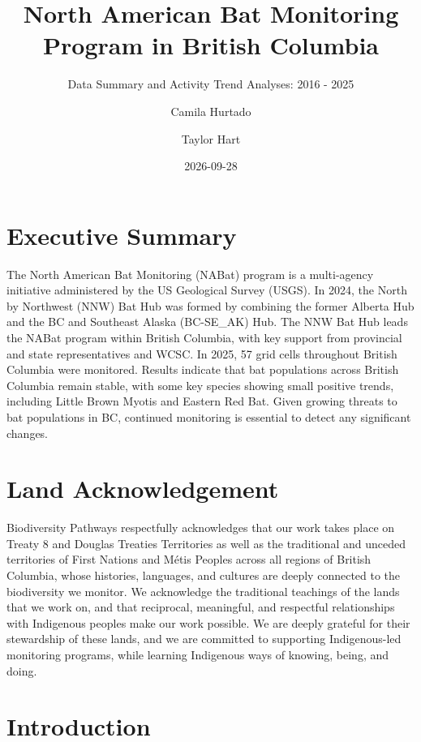 \documentclass[
  letterpaper,
  DIV=11,
  numbers=noendperiod]{scrartcl}
\title{North American Bat Monitoring Program in British Columbia}
\subtitle{Data Summary and Activity Trend Analyses: 2016 - 2025}
\author{Camila Hurtado \and Taylor Hart}
\date{2026-09-28}
\renewcommand*\contentsname{Table of contents}
\newcommand\contentsname{Table of contents}
\begin{document}
\maketitle

\clearpage

\renewcommand*\contentsname{Table of contents}
{
\setcounter{tocdepth}{3}
\tableofcontents
}

\newpage{}

\section{Executive Summary}\label{executive-summary}

The North American Bat Monitoring (NABat) program is a multi-agency
initiative administered by the US Geological Survey (USGS). In 2024, the
North by Northwest (NNW) Bat Hub was formed by combining the former
Alberta Hub and the BC and Southeast Alaska (BC-SE\_AK) Hub. The NNW Bat
Hub leads the NABat program within British Columbia, with key support
from provincial and state representatives and WCSC. In 2025, 57 grid
cells throughout British Columbia were monitored. Results indicate that
bat populations across British Columbia remain stable, with some key
species showing small positive trends, including Little Brown Myotis and
Eastern Red Bat. Given growing threats to bat populations in BC,
continued monitoring is essential to detect any significant changes.

\section{Land Acknowledgement}\label{land-acknowledgement}

Biodiversity Pathways respectfully acknowledges that our work takes
place on Treaty 8 and Douglas Treaties Territories as well as the
traditional and unceded territories of First Nations and Métis Peoples
across all regions of British Columbia, whose histories, languages, and
cultures are deeply connected to the biodiversity we monitor. We
acknowledge the traditional teachings of the lands that we work on, and
that reciprocal, meaningful, and respectful relationships with
Indigenous peoples make our work possible. We are deeply grateful for
their stewardship of these lands, and we are committed to supporting
Indigenous-led monitoring programs, while learning Indigenous ways of
knowing, being, and doing.

\newpage{}

\section{Introduction}\label{introduction}
\end{document}
